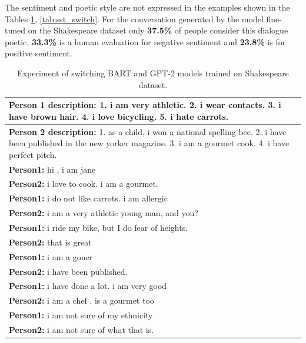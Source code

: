 The sentiment and poetic style are not expressed in the examples shown in the Tables \ref{tab:shakespeare_switch}, \ref{tab:sst_switch}. For the conversation generated by the model fine-tuned on the Shakespeare dataset only \textbf{37.5\%} of people consider this dialogue poetic. \textbf{33.3\%} is a human evaluation for negative sentiment and \textbf{23.8\%} is for positive sentiment.

\begin{table}[H]
\centering
 \begin{tabular}{|p{14cm}|} 
 \hline
 \textbf{Person 1 description:} 1. i am very athletic. 2. i wear contacts. 3. i have brown hair. 4. i love bicycling. 5. i hate carrots. \\
 \hline
 \textbf{Person 2 description:} 1. as a child, i won a national spelling bee. 2. i have been published in the new yorker magazine. 3. i am a gourmet cook. 4. i have perfect pitch. \\
 \hline
 \textbf{Person1:} hi , i am jane  \\
 \textbf{Person2:} i love to cook. i am a gourmet. \\ 
 \textbf{Person1:} i do not like carrots. i am allergic \\
 \textbf{Person2:} i am a very athletic young man, and you?\\
 \textbf{Person1:} i ride my bike, but I do fear of heights. \\
 \textbf{Person2:} that is great \\
 \textbf{Person1:} i am a goner  \\
 \textbf{Person2:} i have been published.\\
 \textbf{Person1:} i have done a lot. i am very good  \\
 \textbf{Person2:} i am a chef . is a gourmet too \\
 \textbf{Person1:} i am not sure of my ethnicity \\
 \textbf{Person2:} i am not sure of what that is. \\
 \hline
 \end{tabular}
 \caption{Experiment of switching BART and GPT-2 models trained on Shakespeare dataset.}
\label{tab:shakespeare_switch}
\end{table}

